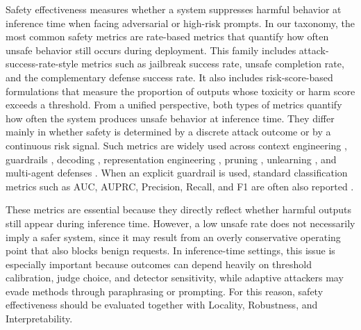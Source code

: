 Safety effectiveness measures whether a system suppresses harmful behavior at inference time when facing adversarial or high-risk prompts. In our taxonomy, the most common safety metrics are rate-based metrics that quantify how often unsafe behavior still occurs during deployment. This family includes attack-success-rate-style metrics such as jailbreak success rate, unsafe completion rate, and the complementary defense success rate. It also includes risk-score-based formulations that measure the proportion of outputs whose toxicity or harm score exceeds a threshold. From a unified perspective, both types of metrics quantify how often the system produces unsafe behavior at inference time. They differ mainly in whether safety is determined by a discrete attack outcome or by a continuous risk signal. Such metrics are widely used across context engineering \citep{kumar2024certifying, cao2024defending, ji2024defending, zhou2024defending}, guardrails \citep{DBLP:journals/corr/abs-2504-00441, DBLP:conf/nips/HanREJL00D24, sharma2025constitutional, Padhi2024GraniteG, Lees2022ANG, Zeng2025ShieldGemma2R}, decoding \citep{Xu2024SafeDecodingDA, Liu2024AlignmentEnhancedDD, Zeng2024RootDS, Zhao2024AdversarialCD, Huang2024SafeAlignerSA, Gallego2025MetaSCTS, Ghosal2024ImmuneIS}, representation engineering \citep{Arditi2024SingleDirection, Lee2024CAST, Sheng2025AlphaSteer, zhao2025adasteer}, pruning \citep{hasan2024pruning, chen2025safeptr, li-etal-2025-hierarchical, zhao2025understanding, DBLP:conf/emnlp/XuG0BS24, DBLP:conf/icml/HongDZLXLDBJXKH24, zhang2025activation}, unlearning \citep{deng2025guard, yan2025dual, zhang2024theft, DBLP:conf/acl/TakashiroKGCIM25}, and multi-agent defenses \citep{asad2025reddebatesaferresponsesmultiagent, fan2025peerguarddefendingmultiagentsystems, qi2025amplifiedvulnerabilitiesstructuredjailbreak, DBLP:conf/acl/HeLD00025, DBLP:conf/acl/Shahroz0YF025}. When an explicit guardrail is used, standard classification metrics such as AUC, AUPRC, Precision, Recall, and F1 are often also reported \citep{Padhi2024GraniteG, Chi2024LlamaG3, Zeng2025ShieldGemma2R, Kumar2025PolyGuardAM, Lee2025SafeRouteAM, Liu2025GuardReasonerTR}. 

These metrics are essential because they directly reflect whether harmful outputs still appear during inference time. However, a low unsafe rate does not necessarily imply a safer system, since it may result from an overly conservative operating point that also blocks benign requests. In inference-time settings, this issue is especially important because outcomes can depend heavily on threshold calibration, judge choice, and detector sensitivity, while adaptive attackers may evade methods through paraphrasing or prompting. For this reason, safety effectiveness should be evaluated together with Locality, Robustness, and Interpretability.


